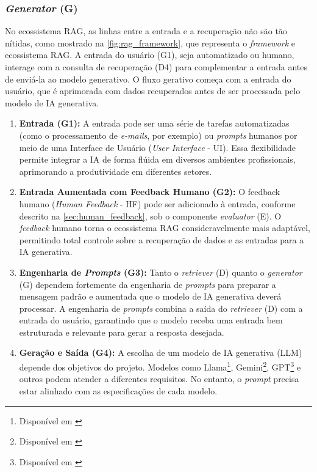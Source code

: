 \documentclass[a4paper, 12pt]{article}
\newcommand{\citeb}[1]{\bibleftbracket\cite{#1}\bibrightbracket}
\begin{document}
    \subsubsection{\textit{Generator} (G)}

    No ecossistema RAG, as linhas entre a entrada e a recuperação não são tão nítidas, como mostrado na \autoref{fig:rag_framework}, que representa o \textit{framework} e ecossistema RAG. A entrada do usuário (G1), seja automatizado ou humano, interage com a consulta de recuperação (D4) para complementar a entrada antes de enviá-la ao modelo generativo. O fluxo gerativo começa com a entrada do usuário, que é aprimorada com dados recuperados antes de ser processada pelo modelo de IA generativa.

    \begin{enumerate}
        \item \textbf{Entrada (G1):} A entrada pode ser uma série de tarefas automatizadas (como o processamento de \textit{e-mails}, por exemplo) ou \textit{prompts} humanos por meio de uma Interface de Usuário (\textit{User Interface} - UI). Essa flexibilidade permite integrar a IA de forma flúida em diversos ambientes profissionais, aprimorando a produtividade em diferentes setores.
        \item \textbf{Entrada Aumentada com Feedback Humano (G2):} O feedback humano (\textit{Human Feedback} - HF) pode ser adicionado à entrada, conforme descrito na \autoref{sec:human_feedback}, sob o componente \textit{evaluator} (E). O \textit{feedback} humano torna o ecossistema RAG consideravelmente mais adaptável, permitindo total controle sobre a recuperação de dados e as entradas para a IA generativa.
        \item \textbf{Engenharia de \textit{Prompts} (G3):} Tanto o \textit{retriever} (D) quanto o \textit{generator} (G) dependem fortemente da engenharia de \textit{prompts} para preparar a mensagem padrão e aumentada que o modelo de IA generativa deverá processar. A engenharia de \textit{prompts} combina a saída do \textit{retriever} (D) com a entrada do usuário, garantindo que o modelo receba uma entrada bem estruturada e relevante para gerar a resposta desejada.
        \item \textbf{Geração e Saída (G4):} A escolha de um modelo de IA generativa (LLM) depende dos objetivos do projeto. Modelos como Llama\footnote{Disponível em \citeb{llama_models}}, Gemini\footnote{Disponível em \citeb{gemini_models}}, GPT\footnote{Disponível em \citeb{gpt_models}} e outros podem atender a diferentes requisitos. No entanto, o \textit{prompt} precisa estar alinhado com as especificações de cada modelo.
    \end{enumerate}
\end{document}
